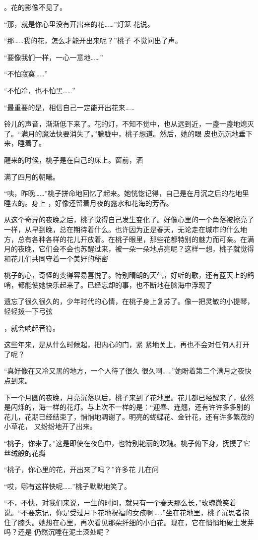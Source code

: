\documentclass{article}
\begin{document}
\newpage
。花的影像不见了。 

“那，就是你心里没有开出来的花……”灯笼
花说。 

“那……我的花，怎么才能开出来呢？”桃子
不觉问出了声。 


“要像我们一样，一心一意地……” 


“不怕寂寞……” 


“不怕冷，也不怕黑……” 

“最重要的是，相信自己一定能开出花来……

铃儿的声音，渐渐低下来了。花的灯，不知不觉中，也从远到近，一盏一盏地熄灭了。“满月的魔法快要消失了。”朦胧中，桃子想道。然后，她的眼
皮也沉沉地垂下来，睡着了。 

醒来的时候，桃子是在自己的床上。窗前，洒
\newpage

满了四月的朝曦。 

“咦，昨晚……”桃子拼命地回忆了起来。她恍惚记得，自己是在月沉之后的花地里睡去的。身上
，好像还留着月夜的露水和花海的芳香。 

从这个奇异的夜晚之后，桃子觉得自己发生变化了。好像心里的一个角落被擦亮了一样，从早到晚，总在期待着什么。也许因为正是春天，无论走在城市的什么地方，总有各种各样的花儿开放着。在桃子眼里，那些花都特别的魅力而可亲。在满月的夜晚，它们会不会也苏醒过来，被一朵一朵地点亮呢？这样一想，桃子就觉得和花儿们共同守着一个美好的秘密

桃子的心，奇怪的变得容易喜悦了。特别晴朗的天气，好听的歌，还有蓝天上的鸽哨，都能使她快乐起来了。已经忘却的事，也不断地在脑海中浮现了

遗忘了很久很久的，少年时代的心情，在桃子身上复苏了。像一把灵敏的小提琴，轻轻拨一下弓弦

\newpage
，就会响起音符。 

这些年来，是从什么时候起，把内心的门，紧
紧地关上，再也不会对任何人打开了呢？ 

“真好像在又冷又黑的地方，一个人待了很久
很久啊……”她盼着第二个满月之夜快点到来。 

下一个月圆的夜晚，月亮沉落以后，桃子来到了花地里。花儿都已经醒来了，依然是闪烁的，海一样的花灯。与上次不一样的是：“迎春、连翘，还有许许多多别的花儿，花期已经结束了，悄悄地凋谢了。明亮的蝴蝶花、金针花，还有许多繁茂的小草花，
又纷纷地开了出来。 

“桃子，你来了。”这是即使在夜色中，也特别艳丽的玫瑰。桃子俯下身，抚摸了它丝绒般的花瓣

“桃子，你心里的花，开出来了吗？”许多花
儿在问 

“哎，哪有这样快呢……”桃子默默地笑了。
\newpage


“不，不快，对我们来说，一生的时间，就只有一个春天那么长，”玫瑰微笑着说。“不要忘记，你是受过月下花地祝福的女孩啊……”坐在花地里，桃子沉思者抱住了膝头。她想在心里，再次看见那朵纤细的小白花。现在，它在悄悄地破土发芽吗？还是
仍然沉睡在泥土深处呢？ 
\end{document}
